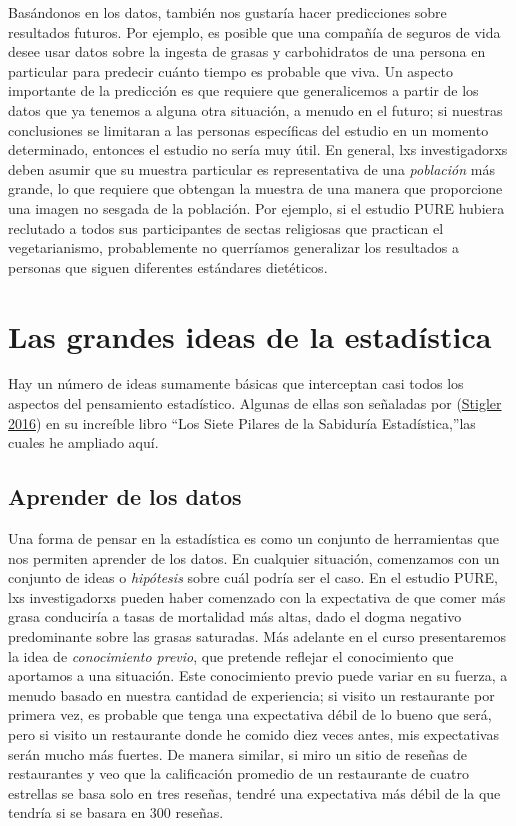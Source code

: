 \documentclass[
  12pt,
]{book}
\begin{document}
Basándonos en los datos, también nos gustaría hacer predicciones sobre resultados futuros. Por ejemplo, es posible que una compañía de seguros de vida desee usar datos sobre la ingesta de grasas y carbohidratos de una persona en particular para predecir cuánto tiempo es probable que viva. Un aspecto importante de la predicción es que requiere que generalicemos a partir de los datos que ya tenemos a alguna otra situación, a menudo en el futuro; si nuestras conclusiones se limitaran a las personas específicas del estudio en un momento determinado, entonces el estudio no sería muy útil. En general, lxs investigadorxs deben asumir que su muestra particular es representativa de una \emph{población} más grande, lo que requiere que obtengan la muestra de una manera que proporcione una imagen no sesgada de la población. Por ejemplo, si el estudio PURE hubiera reclutado a todos sus participantes de sectas religiosas que practican el vegetarianismo, probablemente no querríamos generalizar los resultados a personas que siguen diferentes estándares dietéticos.

\hypertarget{las-grandes-ideas-de-la-estaduxedstica}{%
\section{Las grandes ideas de la estadística}\label{las-grandes-ideas-de-la-estaduxedstica}}

Hay un número de ideas sumamente básicas que interceptan casi todos los aspectos del pensamiento estadístico. Algunas de ellas son señaladas por (\protect\hyperlink{ref-stig}{Stigler 2016}) en su increíble libro ``Los Siete Pilares de la Sabiduría Estadística,''las cuales he ampliado aquí.

\hypertarget{aprender-de-los-datos}{%
\subsection{Aprender de los datos}\label{aprender-de-los-datos}}

Una forma de pensar en la estadística es como un conjunto de herramientas que nos permiten aprender de los datos. En cualquier situación, comenzamos con un conjunto de ideas o \emph{hipótesis} sobre cuál podría ser el caso. En el estudio PURE, lxs investigadorxs pueden haber comenzado con la expectativa de que comer más grasa conduciría a tasas de mortalidad más altas, dado el dogma negativo predominante sobre las grasas saturadas. Más adelante en el curso presentaremos la idea de \emph{conocimiento previo}, que pretende reflejar el conocimiento que aportamos a una situación. Este conocimiento previo puede variar en su fuerza, a menudo basado en nuestra cantidad de experiencia; si visito un restaurante por primera vez, es probable que tenga una expectativa débil de lo bueno que será, pero si visito un restaurante donde he comido diez veces antes, mis expectativas serán mucho más fuertes. De manera similar, si miro un sitio de reseñas de restaurantes y veo que la calificación promedio de un restaurante de cuatro estrellas se basa solo en tres reseñas, tendré una expectativa más débil de la que tendría si se basara en 300 reseñas.
\end{document}
